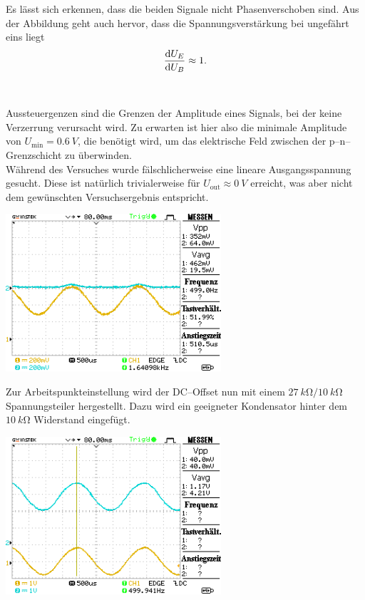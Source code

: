 \documentclass[10pt]{article}
\newenvironment{Figure}
  {\par\medskip\noindent\minipage{\linewidth}}
  {\endminipage\par\medskip}
\begin{document}
\begin{multicols}{2}
\begin{Figure}
	\end{Figure}
	Es lässt sich erkennen, dass die beiden Signale nicht Phasenverschoben sind.
	Aus der Abbildung geht auch hervor, dass die Spannungsverstärkung bei ungefährt eins liegt
	\begin{align}
		\diff[]{U_E}{U_B}\approx 1
		.\end{align}\\\\
	Aussteuergenzen sind die Grenzen der Amplitude eines Signals, bei der keine Verzerrung verursacht wird.
	Zu erwarten ist hier also die minimale Amplitude von $U_{\text{min}}=\SI{0.6}{V}$, die benötigt wird, um das elektrische Feld zwischen der p--n--Grenzschicht zu überwinden.
	\\\indent Während des Versuches wurde fälschlicherweise eine lineare Ausgangsspannung gesucht.
	Diese ist natürlich trivialerweise für $U_{\text{out}}\approx \SI{0}{V}$ erreicht, was aber nicht dem gewünschten Versuchsergebnis entspricht.
	\begin{Figure}
		\centering
		\includegraphics[width=0.6\textwidth]{../data/DS0005.png}
	\end{Figure}
	Zur Arbeitspunkteinstellung wird der DC--Offset nun mit einem $\SI{27}{k\ohm}/\SI{10}{k\ohm}$ Spannungsteiler hergestellt. Dazu wird ein geeigneter Kondensator hinter dem $\SI{10}{k\ohm}$ Widerstand eingefügt.
	\begin{Figure}
		\centering
		\includegraphics[width=0.6\textwidth]{../data/DS0006.png}

\end{Figure}
\end{multicols}
\end{document}
